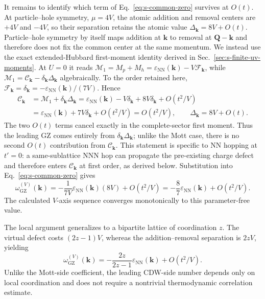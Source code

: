 \documentclass[10pt]{article}
\newcommand{\epsk}{\varepsilon_{\mathrm{NN}}(\mathbf{k})}
\newcommand{\wzero}{\omega_{\mathrm{GZ}}}
\newcommand{\dk}{\delta_{\mathbf{k}}}
\newcommand{\centermom}{\mathcal C_{\mathbf{k}}}
\newcommand{\sep}{\Delta_{\mathbf{k}}}
\begin{document}
It remains to identify which term of Eq.~\ref{eq:s-common-zero} survives at
$O(t)$.  At particle--hole symmetry, $\mu=4V$, the atomic addition and removal
centers are $+4V$ and $-4V$, so their separation retains the atomic value
$\sep=8V+O(t)$.  Particle--hole symmetry by itself maps addition at
$\mathbf k$ to removal at $\mathbf Q-\mathbf k$ and therefore does not fix the
common center at the same momentum.  We instead use the exact extended-Hubbard
first-moment identity derived in Sec.~\ref{sec:s-finite-uv-moments}.  At $U=0$
it reads $\mathcal M_1=M_p+M_h=\epsk-V\mathcal F_{\mathbf k}$, while
$\mathcal M_1=\centermom-\dk\sep$ algebraically.  To the order retained here,
$\mathcal F_{\mathbf k}=\dk=-\epsk/(7V)$.  Hence
\begin{equation}
\begin{aligned}
 \centermom
 &=\mathcal M_1+\dk\sep
 =\epsk-V\dk+8V\dk+O(t^2/V)\\
 &=\epsk+7V\dk+O(t^2/V)=O(t^2/V),
 \qquad \sep=8V+O(t).
\end{aligned}
\label{eq:s-separation-v}
\end{equation}
The two $O(t)$ terms cancel exactly in the complete-sector first moment.  Thus
the leading GZ comes entirely from $\dk\sep$; unlike the Mott case, there is no
second $O(t)$ contribution from $\centermom$.  This statement is specific to
NN hopping at $t'=0$: a same-sublattice NNN hop can propagate the pre-existing
charge defect and therefore enters $\centermom$ at first order, as derived
below.
Substitution into Eq.~\ref{eq:s-common-zero} gives
\begin{equation}
\boxed{\wzero^{(V)}(\mathbf{k})=-\frac{1}{7V}\epsk(8V)+O(t^2/V)
=-\frac87\epsk+O(t^2/V).}
\label{eq:s-v-result}
\end{equation}
The calculated $V$-axis sequence converges monotonically to this parameter-free value.

The local argument generalizes to a bipartite lattice of coordination $z$. The virtual defect costs $(2z-1)V$, whereas the addition--removal separation is $2zV$, yielding
\begin{equation}
\boxed{\wzero^{(V)}(\mathbf{k})
=-\frac{2z}{2z-1}\epsk+O(t^2/V).}
\label{eq:s-v-general-z}
\end{equation}
Unlike the Mott-side coefficient, the leading CDW-side number depends only on local coordination and does not require a nontrivial thermodynamic correlation estimate.
\end{document}
